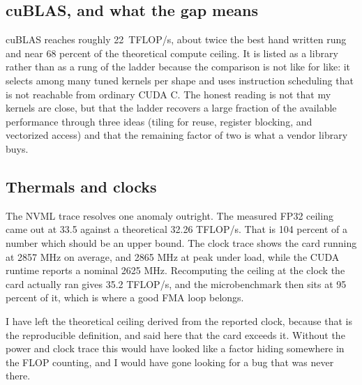 \subsection{cuBLAS, and what the gap means}

cuBLAS reaches roughly \SI{22}{TFLOP/s}, about twice the best hand written rung
and near 68 percent of the theoretical compute ceiling. It is listed as a library
rather than as a rung of the ladder because the comparison is not like for like:
it selects among many tuned kernels per shape and uses instruction scheduling
that is not reachable from ordinary CUDA C. The honest reading is not that my
kernels are close, but that the ladder recovers a large fraction of the available
performance through three ideas (tiling for reuse, register blocking, and
vectorized access) and that the remaining factor of two is what a vendor library
buys.

\subsection{Thermals and clocks}

The NVML trace resolves one anomaly outright. The measured FP32 ceiling came out
at 33.5 against a theoretical 32.26 TFLOP/s. That is 104 percent of a number
which should be an upper bound. The clock trace shows the card running at 2857
MHz on average, and 2865 MHz at peak under load, while the CUDA runtime reports
a nominal 2625 MHz. Recomputing the ceiling at the clock the card actually ran
gives 35.2 TFLOP/s, and the microbenchmark then sits at 95 percent of it, which
is where a good FMA loop belongs.

I have left the theoretical ceiling derived from the reported clock, because that
is the reproducible definition, and said here that the card exceeds it. Without
the power and clock trace this would have looked like a factor hiding somewhere
in the FLOP counting, and I would have gone looking for a bug that was never
there.
